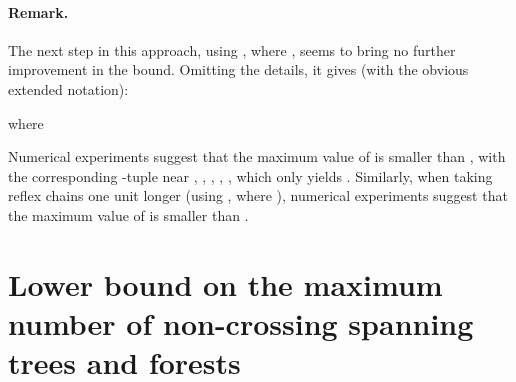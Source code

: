 \documentclass[11pt]{article}
\begin{document}
\paragraph{Remark.}
The next step in this approach, using , where , seems
to bring no further improvement in the bound. Omitting the details, it
gives (with the obvious extended notation):

where

Numerical experiments suggest that the maximum value of 
is smaller than , with the corresponding -tuple near
, ,
, , , which only yields
.
Similarly, when taking reflex chains one unit longer
(using , where ), numerical experiments suggest that
the maximum value of  is smaller than .


\section{Lower bound on the maximum number of
non-crossing spanning trees and forests} \label{sec:trees}
\end{document}
